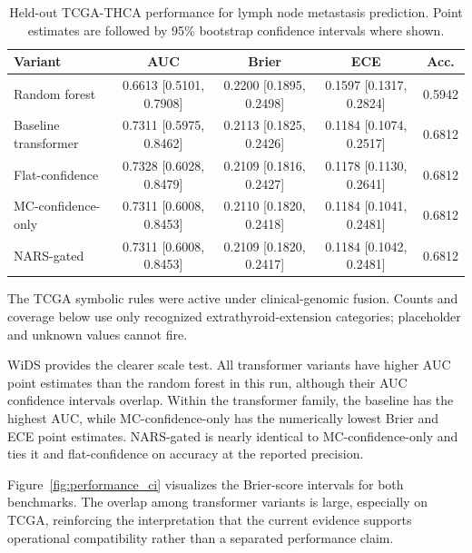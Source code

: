 \documentclass[final]{nesy2026}
\begin{document}
\begin{table}[t]
\caption{Held-out TCGA-THCA performance for lymph node metastasis prediction. Point estimates are followed by 95\% bootstrap confidence intervals where shown.}
\label{tab:tcga_results}
\centering
\scriptsize
\setlength{\tabcolsep}{2.5pt}
\begin{tabular}{@{}lcccc@{}}
\toprule
Variant & AUC & Brier & ECE & Acc. \\
\midrule
Random forest & 0.6613 [0.5101, 0.7908] & 0.2200 [0.1895, 0.2498] & 0.1597 [0.1317, 0.2824] & 0.5942 \\
Baseline transformer & 0.7311 [0.5975, 0.8462] & 0.2113 [0.1825, 0.2426] & 0.1184 [0.1074, 0.2517] & 0.6812 \\
Flat-confidence & 0.7328 [0.6028, 0.8479] & 0.2109 [0.1816, 0.2427] & 0.1178 [0.1130, 0.2641] & 0.6812 \\
MC-confidence-only & 0.7311 [0.6008, 0.8453] & 0.2110 [0.1820, 0.2418] & 0.1184 [0.1041, 0.2481] & 0.6812 \\
NARS-gated & 0.7311 [0.6008, 0.8453] & 0.2109 [0.1820, 0.2417] & 0.1184 [0.1042, 0.2481] & 0.6812 \\
\bottomrule
\end{tabular}
\end{table}

The TCGA symbolic rules were active under clinical-genomic fusion. Counts and coverage below use only recognized extrathyroid-extension categories; placeholder and unknown values cannot fire.

WiDS provides the clearer scale test. All transformer variants have higher AUC point estimates than the random forest in this run, although their AUC confidence intervals overlap. Within the transformer family, the baseline has the highest AUC, while MC-confidence-only has the numerically lowest Brier and ECE point estimates. NARS-gated is nearly identical to MC-confidence-only and ties it and flat-confidence on accuracy at the reported precision.

Figure~\ref{fig:performance_ci} visualizes the Brier-score intervals for both benchmarks. The overlap among transformer variants is large, especially on TCGA, reinforcing the interpretation that the current evidence supports operational compatibility rather than a separated performance claim.
\end{document}

